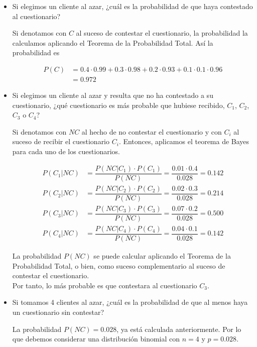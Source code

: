 \documentclass[12pt,a4paper,twoside,openright,titlepage,final]{article}
\begin{document}
\begin{itemize}
\item Si elegimos un cliente al azar, ¿cuál es la probabilidad de que haya contestado al cuestionario?

Si denotamos con $C$ al suceso de contestar el cuestionario, la probabilidad la calculamos aplicando el Teorema de la Probabilidad Total. Así la probabilidad es

\begin{align*}
P(C) &= 0.4 \cdot 0.99 + 0.3 \cdot 0.98 + 0.2 \cdot 0.93 + 0.1 \cdot 0.1 \cdot 0.96 \\ &= 0.972
\end{align*} 

\item Si elegimos un cliente al azar y resulta que no ha contestado a su cuestionario, ¿qué cuestionario es más probable que hubiese recibido, $C_1$, $C_2$, $C_3$ o $C_4$?

Si denotamos con $NC$ al hecho de no contestar el cuestionario y con $C_i$ al suceso de recibir el cuestionario $C_i$. Entonces, aplicamos el teorema de Bayes para cada uno de los cuestionarios.

\begin{align*}
P(C_1 | NC) & = \dfrac{P(NC | C_1) \cdot P(C_1)}{P(NC)} = \dfrac{0.01 \cdot 0.4}{0.028} = 0.142 \\
P(C_2 | NC) & = \dfrac{P(NC | C_2) \cdot P(C_2)}{P(NC)} = \dfrac{0.02 \cdot 0.3}{0.028} = 0.214 \\
P(C_3 | NC) & = \dfrac{P(NC | C_3) \cdot P(C_3)}{P(NC)} = \dfrac{0.07 \cdot 0.2}{0.028} = 0.500 \\
P(C_4 | NC) & = \dfrac{P(NC | C_4) \cdot P(C_4)}{P(NC)} = \dfrac{0.04 \cdot 0.1}{0.028} = 0.142
\end{align*}

La probabilidad $P(NC)$ se puede calcular aplicando el Teorema de la Probabilidad Total, o bien, como suceso complementario al suceso de contestar el cuestionario.\\

Por tanto, lo más probable es que contestara al cuestionario $C_3$.

\item Si tomamos 4 clientes al azar, ¿cuál es la probabilidad de que al menos haya un cuestionario sin contestar?

La probabilidad $P(NC) = 0.028$, ya está calculada anteriormente. Por lo que debemos considerar una distribución binomial con $n = 4$ y $p = 0.028$.\\


\end{itemize}
\end{document}
